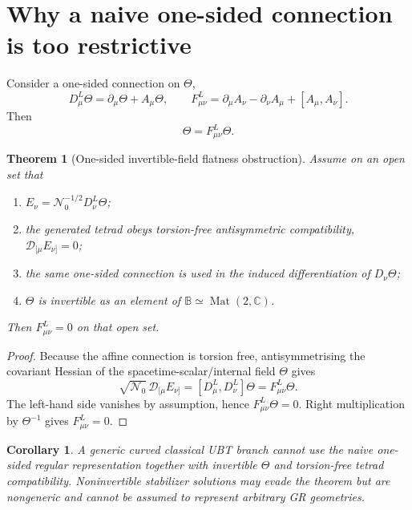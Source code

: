 \documentclass[12pt,a4paper]{article}
\newtheorem{theorem}[definition]{Theorem}
\newtheorem{corollary}[definition]{Corollary}
\theoremstyle{remark}\newtheorem{remark}[definition]{Remark}
\newcommand{\B}{\mathbb B}
\begin{document}
\section{Why a naive one-sided connection is too restrictive}
Consider a one-sided connection on $\Theta$,
\begin{equation}
 D^L_\mu\Theta=\partial_\mu\Theta+A_\mu\Theta,
 \qquad
 F^L_{\mu\nu}=\partial_\mu A_\nu-\partial_\nu A_\mu+[A_\mu,A_\nu].
 \label{eq:left-connection}
\end{equation}
Then
\begin{equation}
 [D^L_\mu,D^L_\nu]\Theta=F^L_{\mu\nu}\Theta.
 \label{eq:left-curvature}
\end{equation}

\begin{theorem}[One-sided invertible-field flatness obstruction]
\label{thm:one-sided-no-go}
Assume on an open set that
\begin{enumerate}
 \item $E_\nu=\mathcal N_0^{-1/2}D^L_\nu\Theta$;
 \item the generated tetrad obeys torsion-free antisymmetric compatibility,
       $\mathscr D_{[\mu}E_{\nu]}=0$;
 \item the same one-sided connection is used in the induced differentiation
       of $D_\nu\Theta$;
 \item $\Theta$ is invertible as an element of
       $\B\simeq\operatorname{Mat}(2,\mathbb C)$.
\end{enumerate}
Then $F^L_{\mu\nu}=0$ on that open set.
\end{theorem}

\begin{proof}
Because the affine connection is torsion free, antisymmetrising the covariant
Hessian of the spacetime-scalar/internal field $\Theta$ gives
\begin{equation}
 \sqrt{\mathcal N_0}\,\mathscr D_{[\mu}E_{\nu]}
 =[D^L_\mu,D^L_\nu]\Theta
 =F^L_{\mu\nu}\Theta.
\end{equation}
The left-hand side vanishes by assumption, hence
$F^L_{\mu\nu}\Theta=0$.  Right multiplication by $\Theta^{-1}$ gives
$F^L_{\mu\nu}=0$.
\end{proof}

\begin{corollary}
A generic curved classical UBT branch cannot use the naive one-sided regular
representation together with invertible $\Theta$ and torsion-free tetrad
compatibility.  Noninvertible stabilizer solutions may evade the theorem but
are nongeneric and cannot be assumed to represent arbitrary GR geometries.
\end{corollary}
\end{document}
